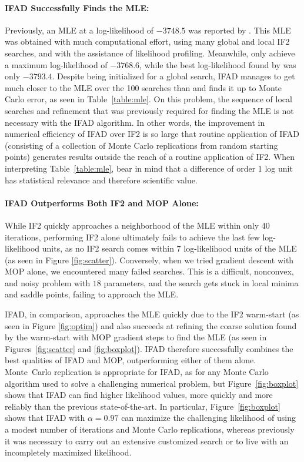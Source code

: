 \documentclass[11pt]{article}
\begin{document}
\paragraph{IFAD Successfully Finds the MLE:} Previously, an MLE at a log-likelihood of $-3748.5$ was reported by \cite{king16}.
This MLE was obtained with much computational effort, using many global and local IF2 searches, and with the assistance of likelihood profiling.
Meanwhile, \cite{ionides15} only achieve a maximum log-likelihood of $-3768.6$, while the best log-likelihood found by \cite{king08} was only $-3793.4$.
Despite being initialized for a global search, IFAD manages to get much closer to the MLE over the 100 searches than \cite{ionides15} and finds it up to Monte Carlo error, as seen in Table~\ref{table:mle}.
On this problem, the sequence of local searches and refinement that was previously required for finding the MLE is not necessary with the IFAD algorithm. 
In other words, the improvement in numerical efficiency of IFAD over IF2 is so large that routine application of IFAD (consisting of a collection of Monte Carlo replications from random starting points) generates results outside the reach of a routine application of IF2. 
When interpreting Table~\ref{table:mle}, bear in mind that a difference of order 1 log unit has statistical relevance and therefore scientific value.

\paragraph{IFAD Outperforms Both IF2 and MOP Alone:} While IF2 quickly approaches a neighborhood of the MLE within only 40 iterations, performing IF2 alone ultimately fails to achieve the last few log-likelihood units, as no IF2 search comes within 7 log-likelihood units of the MLE (as seen in Figure \ref{fig:scatter}). Conversely, when we tried gradient descent with MOP alone, we encountered many failed searches. This is a difficult, nonconvex, and noisy problem with $18$ parameters, and the search gets stuck in local minima and saddle points, failing to approach the MLE. 

IFAD, in comparison, approaches the MLE quickly due to the IF2 warm-start (as seen in Figure \ref{fig:optim}) and also succeeds at refining the coarse solution found by the warm-start with MOP gradient steps to find the MLE (as seen in Figures~\ref{fig:scatter} and \ref{fig:boxplot}). IFAD therefore successfully combines the best qualities of IFAD and MOP, outperforming either of them alone.
Monte~Carlo replication is appropriate for IFAD, as for any Monte Carlo algorithm used to solve a challenging numerical problem, but Figure~\ref{fig:boxplot} shows that IFAD can find higher likelihood values, more quickly and more reliably than the previous state-of-the-art. 
In particular, Figure~\ref{fig:boxplot} shows that IFAD with $\alpha=0.97$ can maximize the challenging likelihood of \cite{king08} using a modest number of iterations and Monte Carlo replications, whereas previously it was necessary to carry out an extensive customized search or to live with an incompletely maximized likelihood.
\end{document}
